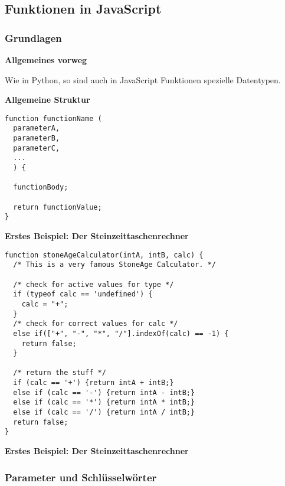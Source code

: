 \subsection{Funktionen in JavaScript}

\subsubsection{Grundlagen}

\par\noindent\textbf{Allgemeines vorweg}

Wie in Python, so sind auch in JavaScript Funktionen spezielle
Datentypen.

\par\noindent\textbf{Allgemeine Struktur}

\begin{verbatim}
function functionName (
  parameterA,
  parameterB,
  parameterC,
  ...
  ) {

  functionBody;

  return functionValue;
}
\end{verbatim}

\par\noindent\textbf{Erstes Beispiel: Der Steinzeittaschenrechner}

\begin{verbatim}
function stoneAgeCalculator(intA, intB, calc) {
  /* This is a very famous StoneAge Calculator. */

  /* check for active values for type */
  if (typeof calc == 'undefined') {
    calc = "+";
  }
  /* check for correct values for calc */
  else if(["+", "-", "*", "/"].indexOf(calc) == -1) {
    return false;
  }

  /* return the stuff */
  if (calc == '+') {return intA + intB;}
  else if (calc == '-') {return intA - intB;}
  else if (calc == '*') {return intA * intB;}
  else if (calc == '/') {return intA / intB;}
  return false;
}
\end{verbatim}




\par\noindent\textbf{Erstes Beispiel: Der Steinzeittaschenrechner}



\subsubsection{\texorpdfstring{{Parameter und
Schlüsselwörter}}{Parameter und Schlüsselwörter}}

